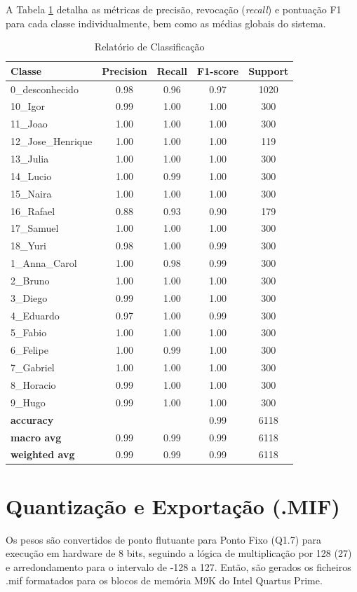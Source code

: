 A Tabela \ref{tab:relatorio_classificacao} detalha as métricas de precisão, revocação (\textit{recall}) e pontuação F1 para cada classe individualmente, bem como as médias globais do sistema.

\begin{table}[H]
\centering
\caption{Relatório de Classificação}
\label{tab:relatorio_classificacao}
\begin{tabular}{l c c c c}
\toprule
\textbf{Classe} & \textbf{Precision} & \textbf{Recall} & \textbf{F1-score} & \textbf{Support} \\
\midrule
0\_desconhecido    & 0.98 & 0.96 & 0.97 & 1020 \\
10\_Igor           & 0.99 & 1.00 & 1.00 & 300  \\
11\_Joao           & 1.00 & 1.00 & 1.00 & 300  \\
12\_Jose\_Henrique & 1.00 & 1.00 & 1.00 & 119  \\
13\_Julia          & 1.00 & 1.00 & 1.00 & 300  \\
14\_Lucio          & 1.00 & 0.99 & 1.00 & 300  \\
15\_Naira          & 1.00 & 1.00 & 1.00 & 300  \\
16\_Rafael         & 0.88 & 0.93 & 0.90 & 179  \\
17\_Samuel         & 1.00 & 1.00 & 1.00 & 300  \\
18\_Yuri           & 0.98 & 1.00 & 0.99 & 300  \\
1\_Anna\_Carol     & 1.00 & 0.98 & 0.99 & 300  \\
2\_Bruno           & 1.00 & 1.00 & 1.00 & 300  \\
3\_Diego           & 0.99 & 1.00 & 1.00 & 300  \\
4\_Eduardo         & 0.97 & 1.00 & 0.99 & 300  \\
5\_Fabio           & 1.00 & 1.00 & 1.00 & 300  \\
6\_Felipe          & 1.00 & 0.99 & 1.00 & 300  \\
7\_Gabriel         & 1.00 & 1.00 & 1.00 & 300  \\
8\_Horacio         & 0.99 & 1.00 & 1.00 & 300  \\
9\_Hugo            & 0.99 & 1.00 & 1.00 & 300  \\
\midrule
\textbf{accuracy}     &      &      & 0.99 & 6118 \\
\textbf{macro avg}    & 0.99 & 0.99 & 0.99 & 6118 \\
\textbf{weighted avg} & 0.99 & 0.99 & 0.99 & 6118 \\
\bottomrule
\end{tabular}
\end{table}

\section{Quantização e Exportação (.MIF)}
Os pesos são convertidos de ponto flutuante para Ponto Fixo (Q1.7) para execução em hardware de 8 bits, seguindo a lógica de multiplicação por 128 (27) e arredondamento para o intervalo de -128 a 127. Então, são gerados os ficheiros .mif formatados para os blocos de memória M9K do Intel Quartus Prime.
